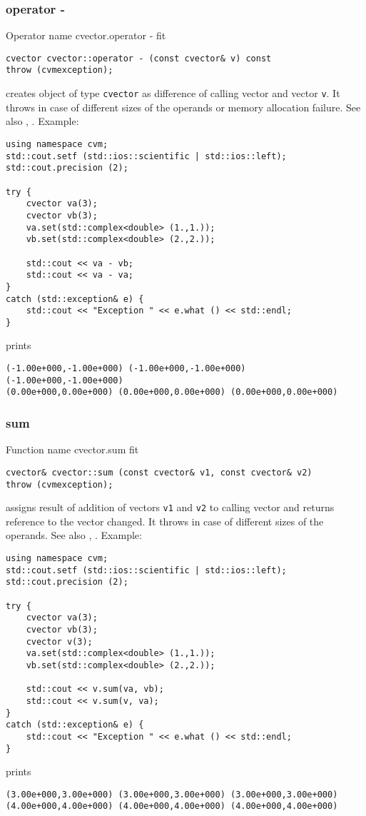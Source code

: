 \subsubsection{operator -}
Operator%
\pdfdest name {cvector.operator -} fit
\begin{verbatim}
cvector cvector::operator - (const cvector& v) const
throw (cvmexception);
\end{verbatim}
creates  object of type \verb"cvector" as  difference of
 calling vector and  vector \verb"v".
It throws  
in case of different sizes of the operands
or memory allocation failure.
See also , .
Example:
\begin{Verbatim}
using namespace cvm;
std::cout.setf (std::ios::scientific | std::ios::left);
std::cout.precision (2);

try {
    cvector va(3);
    cvector vb(3);
    va.set(std::complex<double> (1.,1.));
    vb.set(std::complex<double> (2.,2.));

    std::cout << va - vb;
    std::cout << va - va;
}
catch (std::exception& e) {
    std::cout << "Exception " << e.what () << std::endl;
}
\end{Verbatim}
prints
\begin{Verbatim}
(-1.00e+000,-1.00e+000) (-1.00e+000,-1.00e+000) (-1.00e+000,-1.00e+000)
(0.00e+000,0.00e+000) (0.00e+000,0.00e+000) (0.00e+000,0.00e+000)
\end{Verbatim}
\newpage


\subsubsection{sum}
Function%
\pdfdest name {cvector.sum} fit
\begin{verbatim}
cvector& cvector::sum (const cvector& v1, const cvector& v2)
throw (cvmexception);
\end{verbatim}
assigns  result of addition of
vectors \verb"v1" and \verb"v2"  to  calling vector
and returns  reference to
the vector changed.
It throws  
in case of different sizes of the operands.
See also ,
.
Example:
\begin{Verbatim}
using namespace cvm;
std::cout.setf (std::ios::scientific | std::ios::left);
std::cout.precision (2);

try {
    cvector va(3);
    cvector vb(3);
    cvector v(3);
    va.set(std::complex<double> (1.,1.));
    vb.set(std::complex<double> (2.,2.));

    std::cout << v.sum(va, vb);
    std::cout << v.sum(v, va);
}
catch (std::exception& e) {
    std::cout << "Exception " << e.what () << std::endl;
}
\end{Verbatim}
prints
\begin{Verbatim}
(3.00e+000,3.00e+000) (3.00e+000,3.00e+000) (3.00e+000,3.00e+000)
(4.00e+000,4.00e+000) (4.00e+000,4.00e+000) (4.00e+000,4.00e+000)
\end{Verbatim}
\newpage


